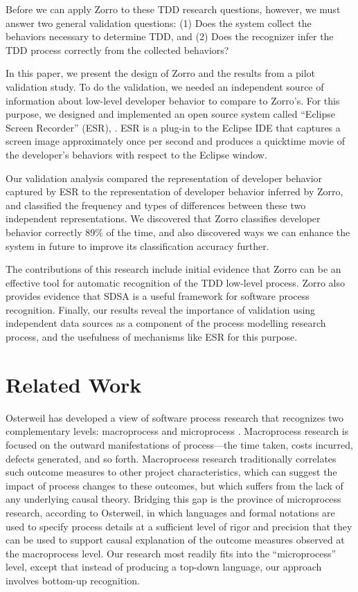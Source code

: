 \documentclass[runningheads]{llncs}
\begin{document}
Before we can apply Zorro to these TDD research questions, however, we must
answer two general validation questions: (1) Does the system collect the
behaviors necessary to determine TDD, and (2) Does the recognizer infer the
TDD process correctly from the collected behaviors?

In this paper, we present the design of Zorro and the results from a pilot
validation study.  To do the validation, we needed an independent source of
information about low-level developer behavior to compare to Zorro's.  For this
purpose, we designed and implemented an open source system called ``Eclipse Screen
Recorder'' (ESR), \cite{EclipseScreenRecorder}. ESR is a plug-in to the
Eclipse IDE that captures a screen image approximately once per second and
produces a quicktime movie of the developer's behaviors with respect to the
Eclipse window.

Our validation analysis compared the representation of developer behavior
captured by ESR to the representation of developer behavior inferred by
Zorro, and classified the frequency and types of differences between these
two independent representations.  We discovered that Zorro classifies
developer behavior correctly 89\% of the time, and also discovered ways we
can enhance the system in future to improve its classification accuracy further.

The contributions of this research include initial evidence that Zorro can
be an effective tool for automatic recognition of the TDD low-level
process.  Zorro also provides evidence that SDSA is a useful framework for
software process recognition.  Finally, our results reveal the importance
of validation using independent data sources as a component of the process
modelling research process, and the usefulness of mechanisms like ESR for
this purpose.

\section{Related Work}
\label{sec:related}

Osterweil has developed a view of software process research that recognizes
two complementary levels: macroprocess and microprocess \cite{Osterweil05}.
Macroprocess research is focused on the outward manifestations of
process---the time taken, costs incurred, defects generated, and so
forth. Macroprocess research traditionally correlates such outcome measures
to other project characteristics, which can suggest the impact of process
changes to these outcomes, but which suffers from the lack of any
underlying causal theory.  Bridging this gap is the province of
microprocess research, according to Osterweil, in which languages and
formal notations are used to specify process details at a sufficient level
of rigor and precision that they can be used to support causal explanation
of the outcome measures observed at the macroprocess level.  Our research
most readily fits into the ``microprocess'' level, except that instead of
producing a top-down language, our approach involves bottom-up recognition.
\end{document}
